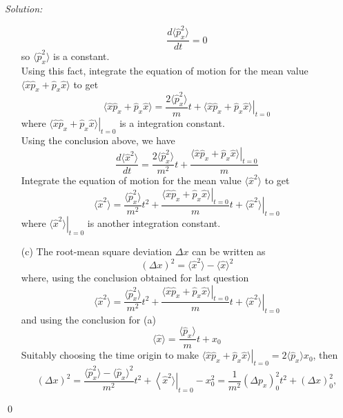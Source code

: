 \documentclass[12pt,a4paper]{article}
\newenvironment{sol}
    {\emph{Solution:}
    }
    {
    \qed
    }
\begin{document}
\begin{sol}
\begin{itemize}
\begin{equation}
\frac{d\langle\hat{p}_x^2\rangle}{dt}=0
\end{equation}
so $\langle\hat{p}_x^2\rangle$ is a constant.\\
Using this fact, integrate the equation of motion for the mean value $\langle\hat{x}\hat{p}_x+\hat{p}_x\hat{x}\rangle$ to get
\begin{equation}
\langle\hat{x}\hat{p}_x+\hat{p}_x\hat{x}\rangle=\frac{2\langle\hat{p}_x^2\rangle}{m}t+\left.\langle\hat{x}\hat{p}_x+\hat{p}_x\hat{x}\rangle\right|_{t=0}
\end{equation}
where $\left.\langle\hat{x}\hat{p}_x+\hat{p}_x\hat{x}\rangle\right|_{t=0}$ is a integration constant.\\
Using the conclusion above, we have
\begin{equation}
\frac{d\langle\hat{x}^2\rangle}{dt}=\frac{2\langle\hat{p}_x^2\rangle}{m^2}t+\frac{\left.\langle\hat{x}\hat{p}_x+\hat{p}_x\hat{x}\rangle\right|_{t=0}}{m}
\end{equation}
Integrate the equation of motion for the mean value $\langle\hat{x}^2\rangle$ to get
\begin{equation}
\langle\hat{x}^2\rangle=\frac{\langle\hat{p}_x^2\rangle}{m^2}t^2+\frac{\left.\langle\hat{x}\hat{p}_x+\hat{p}_x\hat{x}\rangle\right|_{t=0}}{m}t+\left.\langle\hat{x}^2\rangle\right|_{t=0}
\end{equation}
where $\left.\langle\hat{x}^2\rangle\right|_{t=0}$ is another integration constant.
\item[(c)] The root-mean square deviation $\Delta x$ can be written as
\begin{equation}
(\Delta x)^2=\langle\hat{x}^2\rangle-\langle\hat{x}\rangle^2
\end{equation}
where, using the conclusion obtained for last question
\begin{equation}
\langle\hat{x}^2\rangle=\frac{\langle\hat{p}_x^2\rangle}{m^2}t^2+\frac{\left.\langle\hat{x}\hat{p}_x+\hat{p}_x\hat{x}\rangle\right|_{t=0}}{m}t+\left.\langle\hat{x}^2\rangle\right|_{t=0}
\end{equation}
and using the conclusion for (a)
\begin{equation}
\langle\hat{x}\rangle=\frac{\langle\hat{p}_x\rangle}{m}t+x_0
\end{equation}
Suitably choosing the time origin to make $\left.\langle\hat{x}\hat{p}_x+\hat{p}_x\hat{x}\rangle\right|_{t=0}=2\langle\hat{p}_x\rangle x_0$, then
\begin{equation}
(\Delta x)^2=\frac{\langle\hat{p}_x^2\rangle-\langle\hat{p}_x\rangle^2}{m^2}t^2+\left\langle\hat{x}^2\rangle\right|_{t=0}-x_0^2=\frac{1}{m^2}(\Delta p_x)_0^2t^2+(\Delta x)_0^2,

\end{equation}
\end{itemize}
\end{sol}
\end{document}
